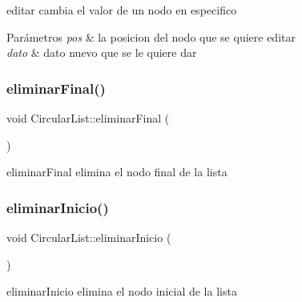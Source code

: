 editar cambia el valor de un nodo en especifico 


\begin{DoxyParams}{Parámetros}
{\em pos} & la posicion del nodo que se quiere editar \\
\hline
{\em dato} & dato nuevo que se le quiere dar \\
\hline
\end{DoxyParams}
\mbox{\label{class_circular_list_a65808e0225fce3f7b90a70973adfc0ff}} 
\subsubsection{\texorpdfstring{eliminar\+Final()}{eliminarFinal()}}
{\footnotesize\ttfamily void Circular\+List\+::eliminar\+Final (\begin{DoxyParamCaption}{ }\end{DoxyParamCaption})\hspace{0.3cm}{\ttfamily [inline]}}



eliminar\+Final elimina el nodo final de la lista 

\mbox{\label{class_circular_list_a3a3c9755cb691e9b02f6d584f2fd1c8e}} 
\subsubsection{\texorpdfstring{eliminar\+Inicio()}{eliminarInicio()}}
{\footnotesize\ttfamily void Circular\+List\+::eliminar\+Inicio (\begin{DoxyParamCaption}{ }\end{DoxyParamCaption})\hspace{0.3cm}{\ttfamily [inline]}}



eliminar\+Inicio elimina el nodo inicial de la lista 

\mbox{\label{class_circular_list_a7cf69aaaf998bac2f5342da4adc5e55d}} 
